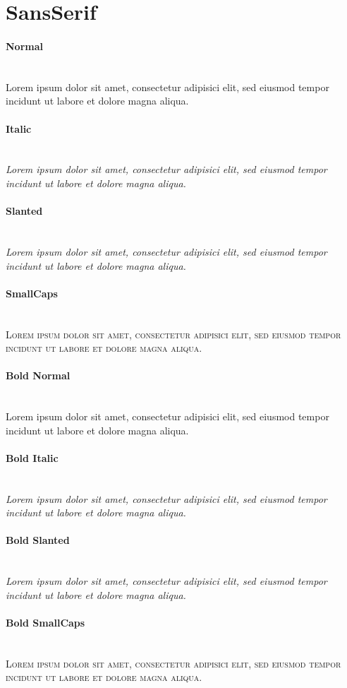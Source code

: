 \documentclass{scrartcl}
\begin{document}
\section*{SansSerif}

{\sffamily
\paragraph{Normal}\hfill\\
{
Lorem ipsum dolor sit amet, consectetur adipisici elit, sed eiusmod tempor
incidunt ut labore et dolore magna aliqua.}
\paragraph{Italic}\hfill\\
{\itshape
Lorem ipsum dolor sit amet, consectetur adipisici elit, sed eiusmod tempor
incidunt ut labore et dolore magna aliqua.}
\paragraph{Slanted}\hfill\\
{\slshape
Lorem ipsum dolor sit amet, consectetur adipisici elit, sed eiusmod tempor
incidunt ut labore et dolore magna aliqua.}
\paragraph{SmallCaps}\hfill\\
{\scshape
Lorem ipsum dolor sit amet, consectetur adipisici elit, sed eiusmod tempor
incidunt ut labore et dolore magna aliqua.}

{\bfseries
\paragraph{Bold Normal}\hfill\\
{
Lorem ipsum dolor sit amet, consectetur adipisici elit, sed eiusmod tempor
incidunt ut labore et dolore magna aliqua.}
\paragraph{Bold Italic}\hfill\\
{\itshape
Lorem ipsum dolor sit amet, consectetur adipisici elit, sed eiusmod tempor
incidunt ut labore et dolore magna aliqua.}
\paragraph{Bold Slanted}\hfill\\
{\slshape
Lorem ipsum dolor sit amet, consectetur adipisici elit, sed eiusmod tempor
incidunt ut labore et dolore magna aliqua.}
\paragraph{Bold SmallCaps}\hfill\\
{\scshape
Lorem ipsum dolor sit amet, consectetur adipisici elit, sed eiusmod tempor
incidunt ut labore et dolore magna aliqua.}
}
}
\end{document}
